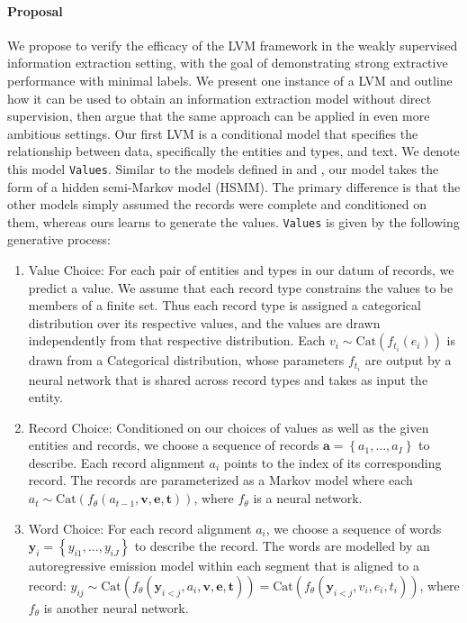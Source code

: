 \documentclass[11pt]{article}
\newcommand\set[1]{\left\{#1\right\}}
\newcommand{\Cat}{\mathrm{Cat}}
\newcommand{\ba}{\mathbf{a}}
\newcommand{\be}{\mathbf{e}}
\newcommand{\bt}{\mathbf{t}}
\newcommand{\bv}{\mathbf{v}}
\newcommand{\by}{\mathbf{y}}
\begin{document}
\paragraph{Proposal}
We propose to verify the efficacy of the LVM framework in the
weakly supervised information extraction setting,
with the goal of demonstrating strong extractive performance with minimal labels.
We present one instance of a LVM and outline how it can be used to obtain
an information extraction model without direct supervision,
then argue that the same approach can be applied in even more ambitious settings.
Our first LVM is a conditional model that specifies
the relationship between data, specifically the entities and types, and text.
We denote this model \texttt{Values}.
Similar to the models defined in \citet{wiseman2018template} and \citet{liang2009semalign},
our model takes the form of a hidden semi-Markov model (HSMM).
The primary difference is that the other models simply assumed the records
were complete and conditioned on them, whereas ours learns to generate the values.
\texttt{Values} is given by the following generative process:
\begin{enumerate}
\item Value Choice:
For each pair of entities and types in our datum of records, we predict a value.
We assume that each record type constrains the values to be members of a finite set.
Thus each record type is assigned a categorical distribution over its respective values,
and the values are drawn independently from that respective distribution.
Each $v_i\sim\Cat(f_{t_i}(e_i))$ is drawn from a Categorical distribution,
whose parameters $f_{t_i}$ are output by a neural network that is shared across record types
and takes as input the entity.
\item Record Choice:
Conditioned on our choices of values as well as the given entities and records,
we choose a sequence of records $\ba = \set{a_1,\ldots,a_I}$ to describe.
Each record alignment $a_i$ points to the index of its corresponding record.
The records are parameterized as a Markov model where each
$a_t\sim\Cat(f_\theta(a_{t-1},\bv,\be,\bt))$,
where $f_\theta$ is a neural network.
\item Word Choice:
For each record alignment $a_i$,
we choose a sequence of words $\by_i = \set{y_{i1},\ldots,y_{iJ}}$ to describe the record.
The words are modelled by an autoregressive emission model within each segment
that is aligned to a record:
$y_{ij}\sim\Cat(f_\theta(\by_{i<j},a_i,\bv,\be,\bt)) = \Cat(f_\theta(\by_{i<j},v_i,e_i,t_i))$,
where $f_\theta$ is another neural network.
\end{enumerate}
\end{document}
